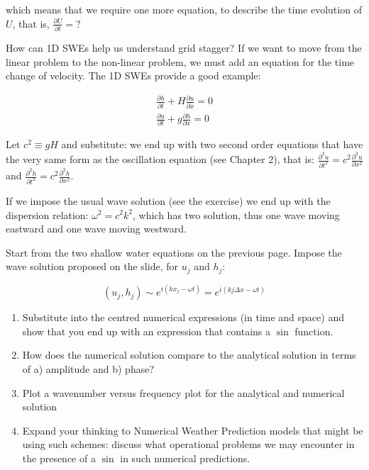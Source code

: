 which means that we require one more equation, to describe the time evolution of $U$, that is, $\frac{\partial U}{\partial t} = ?$

How can 1D SWEs help us understand grid stagger? If we want to move from the linear problem to the non-linear problem, we must add an equation for the time change of velocity. The 1D SWEs provide a good example:

\begin{eqnarray}
	\frac{\partial h}{\partial t} + H \frac{\partial u}{\partial x} = 0 \\
	\frac {\partial u}{\partial t} + g \frac{\partial h}{\partial x} = 0 \nonumber
\end{eqnarray}

Let $c^2 \equiv gH$ and substitute: we end up with two second order equations that have the very same form as the oscillation equation (see Chapter 2), that is: $\frac{\partial^2 u}{\partial t^2} = c^2 \frac{\partial^2 u}{\partial x^2}$ and $\frac{\partial^2 h}{\partial t^2} = c^2 \frac{\partial^2 h}{\partial x^2}$.

If we impose the usual wave solution (see the exercise) we end up with the dispersion relation: $\omega^2 = c^2k^2$, which has two solution, thus one wave moving eastward and one wave moving westward.

\begin{exercise}
	Start from the two shallow water equations on the previous page. Impose the wave solution proposed on the slide, for $u_j$ and $h_j$: 
	
	\begin{equation}
		(u_j,h_j) \sim e^{i(k x_j -\omega t)} = e^{i(k j \Delta x -\omega t)}
	\end{equation}
	
	\begin{enumerate}
		\item Substitute into the centred numerical expressions (in time and space) and show that you end up with an expression that contains a $\sin$ function.
		\item How does the numerical solution compare to the analytical solution in terms of a) amplitude and b) phase?
		\item Plot a wavenumber versus frequency plot for the analytical and numerical solution
		\item Expand your thinking to Numerical Weather Prediction models that might be using such schemes: discuss what operational problems we may encounter in the presence of a $\sin$ in such numerical predictions.
	\end{enumerate}
\end{exercise}

